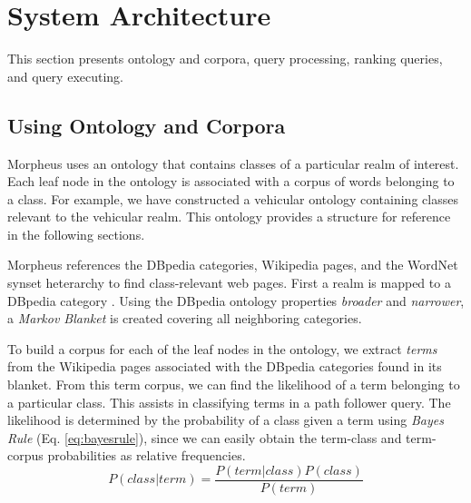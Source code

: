 \section{System Architecture}
\label{sec:systemarch}

This section presents ontology and corpora, query processing, ranking queries, and query executing.

\subsection{Using Ontology and Corpora} 
\label{sec:ontology_corpora}

Morpheus uses an ontology that contains classes of a particular realm of interest. Each leaf node in the ontology is associated with a corpus of words belonging to a class.  For example, we have constructed a vehicular ontology containing classes relevant to the vehicular realm. This ontology provides a structure for reference in the following sections.



Morpheus references the DBpedia categories, Wikipedia pages, and the WordNet synset heterarchy to find class-relevant web pages. First a realm is mapped to a DBpedia category \cite{Bizer2009}. Using the DBpedia ontology properties \emph{broader} and \emph{narrower}, a \emph{Markov Blanket} \cite{PRIS} is created covering all neighboring categories.


To build a corpus for each of the leaf nodes in the ontology, we extract \emph{terms} from the Wikipedia pages associated with the DBpedia categories found in its blanket. From this term corpus, we can find the likelihood of a term belonging to a particular class. This assists in classifying terms in a path follower query. The likelihood is determined by the probability of a class given a term using \textit{Bayes Rule} (Eq. \ref{eq:bayesrule}), since we can easily obtain the term-class and term-corpus probabilities as relative frequencies. 
\begin{equation}
\label{eq:bayesrule}
P (class | term) = \frac{P(term | class) P(class)}{P(term)}
\end{equation}    

